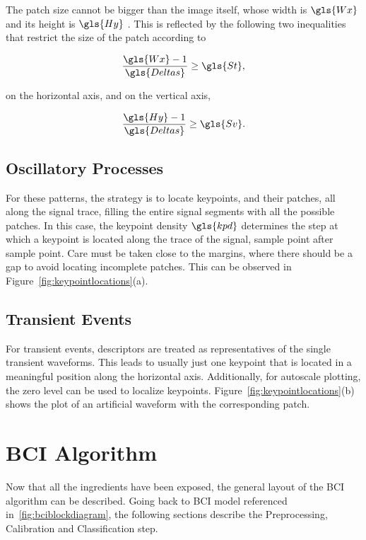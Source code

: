 The patch size cannot be bigger than the image itself, whose width is $\gls{Wx}$ and its height is $\gls{Hy}$ .  This is reflected by the following two inequalities that restrict the size of the patch according to 

\begin{equation}
\frac{\gls{Wx}-1}{\gls{Deltas}}  \geq \gls{St} ,
\label{eq:restriction1}
\end{equation}

\noindent on the horizontal axis, and on the vertical axis, 

\begin{equation}
\frac{\gls{Hy}-1}{\gls{Deltas}}  \geq \gls{Sv}.
\label{eq:restriction2}
\end{equation}

\subsection{Oscillatory Processes}

For these patterns, the strategy is to locate keypoints, and their patches, all along the signal trace, filling the entire signal segments with all the possible patches.  In this case, the keypoint density $\gls{kpd} $ determines the step at which a keypoint is located along the trace of the signal, sample point after sample point. Care must be taken close to the margins, where there should be a gap to avoid locating incomplete patches.  This can be observed in Figure~\ref{fig:keypointlocations}(a).

\subsection{Transient Events}

For transient events, descriptors are treated as representatives of the single transient waveforms.  This leads to usually just one keypoint that is located in a meaningful position along the horizontal axis.  Additionally, for autoscale plotting, the zero level can be used to localize keypoints. Figure~\ref{fig:keypointlocations}(b) shows the plot of an artificial waveform with the corresponding patch.

\section{BCI Algorithm}

Now that all the ingredients have been exposed, the general layout of the BCI algorithm can be described.  Going back to BCI model referenced in~\ref{fig:bciblockdiagram}, the following sections describe the Preprocessing, Calibration and Classification step.

